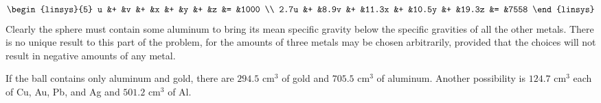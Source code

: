 \begin{exercises}
\begin{answer}
\begin{equation*}
\begin{linsys}{5}
           u  &+  &v    &+  &x     &+  &y     &+  &z     &=  &1000  \\
        2.7u  &+  &8.9v &+  &11.3x &+  &10.5y &+  &19.3z &=  &7558
        \end{linsys}
      \end{equation*}
      Clearly the sphere must contain some aluminum to bring its mean specific
      gravity below the specific gravities of all the other metals.
      There is no unique result to this part of the problem, for the amounts
      of three metals may be chosen arbitrarily, provided that the choices
      will not result in negative amounts of any metal.

      If the ball contains only aluminum and gold, there are
      \( 294.5\mbox{ cm}^3 \) of gold and \( 705.5\mbox{ cm}^3 \) of aluminum.
      Another possibility is \( 124.7\mbox{ cm}^3 \) each of Cu, Au, Pb, and
      Ag and \( 501.2\mbox{ cm}^3  \) of Al.   
    \end{answer}
\end{exercises}

























